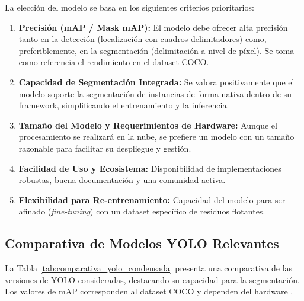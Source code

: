 La elección del modelo se basa en los siguientes criterios prioritarios:

\begin{enumerate}
    \item \textbf{Precisión (mAP / Mask mAP):} El modelo debe ofrecer alta precisión tanto en la detección (localización con cuadros delimitadores) como, preferiblemente, en la segmentación (delimitación a nivel de píxel). Se toma como referencia el rendimiento en el dataset COCO.
    \item \textbf{Capacidad de Segmentación Integrada:} Se valora positivamente que el modelo soporte la segmentación de instancias de forma nativa dentro de su framework, simplificando el entrenamiento y la inferencia.
    \item \textbf{Tamaño del Modelo y Requerimientos de Hardware:} Aunque el procesamiento se realizará en la nube, se prefiere un modelo con un tamaño razonable para facilitar su despliegue y gestión.
    \item \textbf{Facilidad de Uso y Ecosistema:} Disponibilidad de implementaciones robustas, buena documentación y una comunidad activa.
    \item \textbf{Flexibilidad para Re-entrenamiento:} Capacidad del modelo para ser afinado (\textit{fine-tuning}) con un dataset específico de residuos flotantes.
\end{enumerate}

\subsection*{Comparativa de Modelos YOLO Relevantes}
\label{subsec:comparativa_yolo}

La Tabla \ref{tab:comparativa_yolo_condensada} presenta una comparativa de las versiones de YOLO consideradas, destacando su capacidad para la segmentación. Los valores de mAP corresponden al dataset COCO y dependen del hardware \cite{terven2023yolo, sapkota2025yolo}.

